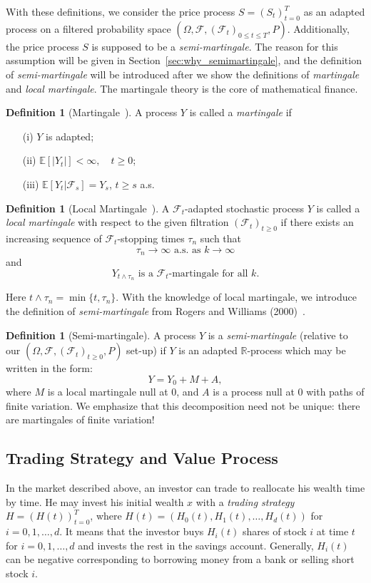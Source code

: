 \documentclass[a4paper]{article}
\theoremstyle{definition}
\newtheorem{definition}[theorem]{Definition}
\numberwithin{equation}{section}
\begin{document}
With these definitions, we consider the price process $S=(S_t)^T_{t=0}$ as an adapted process on a filtered probability space $(\Omega,\mathcal F,(\mathcal F_t)_{0\leq t\leq T},P)$. Additionally, the price process $S$ is supposed to be a \emph{semi-martingale}. The reason for this assumption will be given in Section~\ref{sec:why_semimartingale}, and the definition of \emph{semi-martingale} will be introduced after we show the definitions of \emph{martingale} and \emph{local martingale}. The martingale theory is the core of mathematical finance.
\begin{definition}[Martingale~\cite{def_martingale}]
A process $Y$ is called a \emph{martingale} if
\begin{itemize}
\item[(i)] $Y$ is adapted;
\item[(ii)] $\mathbb E[|Y_t|]<\infty,\quad t\geq0$;
\item[(iii)] $\mathbb E[Y_t|\mathcal F_s]=Y_s$, $t\geq s$ a.s.
\end{itemize}
\end{definition}
\begin{definition}[Local Martingale~\cite{def_local martingale}]
A $\mathcal F_t$-adapted stochastic process $Y$ is called a \emph{local martingale} with respect to the given filtration $(\mathcal F_t)_{t\geq0}$ if there exists an increasing sequence of $\mathcal F_t$-stopping times $\tau_n$ such that
$$\tau_n\rightarrow\infty\text{ a.s. as }k\rightarrow\infty$$
and
$$Y_{t\wedge\tau_n}\text{ is a }\mathcal F_t\text{-martingale for all }k.$$
\end{definition}
Here $t\wedge\tau_n=\min\{t,\tau_n\}$.
With the knowledge of local martingale, we introduce the definition of \emph{semi-martingale} from Rogers and Williams (2000)~\cite{def_semimartingale}.
\begin{definition}[Semi-martingale]
A process $Y$ is a \emph{semi-martingale} (relative to our $(\Omega,\mathcal F,(\mathcal F_t)_{t\geq0},P)$ set-up) if $Y$ is an adapted $\mathbb R$-process which may be written in the form:
$$Y=Y_0+M+A,$$
where $M$ is a local martingale null at $0$, and $A$ is a process null at $0$ with paths of finite variation. We emphasize that this decomposition need not be unique: there are martingales of finite variation!
\end{definition}

\subsection{Trading Strategy and Value Process}\label{sec:value_process}
In the market described above, an investor can trade to reallocate his wealth time by time. He may invest his initial wealth $x$ with a \emph{trading strategy} $H=(H(t))^T_{t=0}$, where $H(t)=(H_0(t),H_1(t),\dots,H_d(t))$ for $i=0,1,\dots,d$. It means that the investor buys $H_i(t)$ shares of stock $i$ at time $t$ for $i=0,1,\dots,d$ and invests the rest in the savings account. Generally, $H_i(t)$ can be negative corresponding to borrowing money from a bank or selling short stock $i$.
\end{document}

